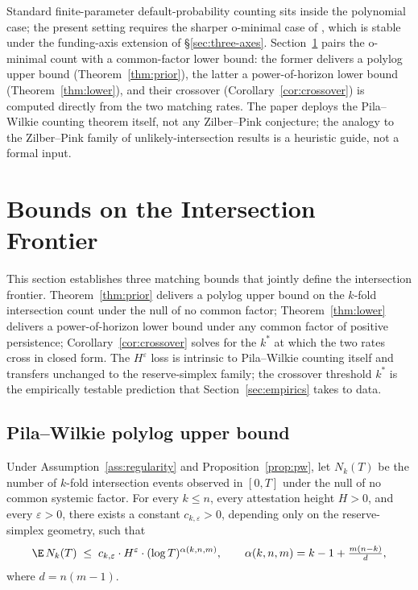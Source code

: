 \begin{remark}
Standard finite-parameter default-probability counting sits inside
the polynomial case; the present setting requires the sharper
o-minimal case of \citet{PilaWilkie2006}, which is stable under the
funding-axis extension of \S\ref{sec:three-axes}.
Section~\ref{sec:bounds} pairs the o-minimal count with a
common-factor lower bound: the former delivers a polylog upper
bound (Theorem~\ref{thm:prior}), the latter a power-of-horizon
lower bound (Theorem~\ref{thm:lower}), and their crossover
(Corollary~\ref{cor:crossover}) is computed directly from the two
matching rates. The paper deploys the Pila--Wilkie counting theorem
itself, not any Zilber--Pink conjecture; the analogy to the
Zilber--Pink family of unlikely-intersection results is a heuristic
guide, not a formal input.
\end{remark}

\section{Bounds on the Intersection Frontier}
\label{sec:bounds}

This section establishes three matching bounds that jointly define
the intersection frontier. Theorem~\ref{thm:prior} delivers a
polylog upper bound on the $k$-fold intersection count under the
null of no common factor; Theorem~\ref{thm:lower} delivers a
power-of-horizon lower bound under any common factor of positive
persistence; Corollary~\ref{cor:crossover} solves for the $k^\ast$
at which the two rates cross in closed form. The
$H^\varepsilon$ loss is intrinsic to Pila--Wilkie counting itself
and transfers unchanged to the reserve-simplex family; the
crossover threshold $k^\ast$ is the empirically testable prediction
that Section~\ref{sec:empirics} takes to data.

\subsection{Pila--Wilkie polylog upper bound}\label{sec:thm-prior}

\begin{theorem}\label{thm:prior}
Under Assumption~\ref{ass:regularity} and
Proposition~\ref{prop:pw}, let $N_k(T)$ be the number of $k$-fold
intersection events observed in $[0,T]$ under the null of no common
systemic factor. For every $k \le n$, every attestation height
$H > 0$, and every $\varepsilon > 0$, there exists a constant
$c_{k,\varepsilon} > 0$, depending only on the reserve-simplex
geometry, such that
\begin{equation}\label{eq:prior-bound}
\E\,N_k(T) \;\le\; c_{k,\varepsilon} \cdot H^{\varepsilon}
\cdot (\log T)^{\alpha(k,n,m)},
\qquad
\alpha(k,n,m) = k - 1 + \tfrac{m(n-k)}{d},
\end{equation}
where $d = n(m-1)$.
\end{theorem}

